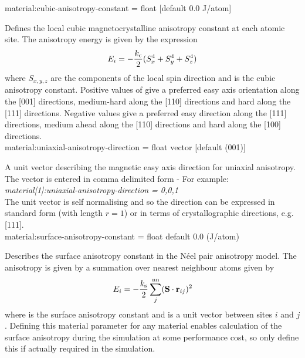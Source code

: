 
{\zicf material:cubic-anisotropy-constant = float [default 0.0 J/atom]}
  Defines the local cubic magnetocrystalline anisotropy constant at each atomic site. The anisotropy energy is given by the expression 
\begin{equation*}
E_i = -\frac{k_{\mathrm{c}}}{2} (S_x^4 + S_y^4 + S_z^4)
\end{equation*}
where $S_{x,y,z}$ are the components of the local spin direction and \kc is the cubic anisotropy constant. Positive values of \kc give a preferred easy axis orientation along the [001] directions, medium-hard along the [110] directions and hard along the [111] directions. Negative values give a preferred easy direction along the [111] directions, medium ahead along the [110] directions and hard along the [100] directions. \\

{\zicf material:uniaxial-anisotropy-direction = float vector [default (001)]} A unit vector \ei describing the magnetic easy axis direction for uniaxial anisotropy. The vector is entered in comma delimited form - For example:\\

\textit{material[1]:uniaxial-anisotropy-direction = 0,0,1}\\

\noindent The unit vector is self normalising and so the direction can be expressed in standard form (with length $r =  1$) or in terms of crystallographic directions, e.g. [111].\\



{\zicf material:surface-anisotropy-constant = float default 0.0 (J/atom)} Describes the surface anisotropy constant in the N\'eel pair anisotropy model. The anisotropy is given by a summation over nearest neighbour atoms given by
\begin{equation*}
E_i = -\frac{k_{\mathrm{s}}}{2} \sum_j^{\mathrm{nn}} (\mathbf{S} \cdot \mathbf{r}_{ij} )^2
\end{equation*}
where \ksurf is the surface anisotropy constant and \rij is a unit vector between sites $i$ and $j$. Defining this material parameter for any material enables calculation of the surface anisotropy during the simulation at some performance cost, so only define this if actually required in the simulation. \\

